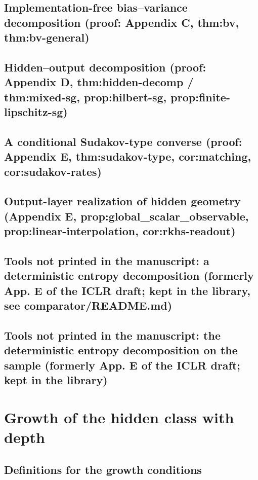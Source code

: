 \section{Implementation-free bias--variance decomposition (proof: Appendix C, thm:bv, thm:bv-general)}

\section{Hidden--output decomposition (proof: Appendix D, thm:hidden-decomp / thm:mixed-sg, prop:hilbert-sg, prop:finite-lipschitz-sg)}

\section{A conditional Sudakov-type converse (proof: Appendix E, thm:sudakov-type, cor:matching, cor:sudakov-rates)}

\section{Output-layer realization of hidden geometry (Appendix E, prop:global\_scalar\_observable, prop:linear-interpolation, cor:rkhs-readout)}

\section{Tools not printed in the manuscript: a deterministic entropy decomposition (formerly App. E of the ICLR draft; kept in the library, see comparator/README.md)}

\section{Tools not printed in the manuscript: the deterministic entropy decomposition on the sample (formerly App. E of the ICLR draft; kept in the library)}

\chapter{Growth of the hidden class with depth}

\section{Definitions for the growth conditions}

